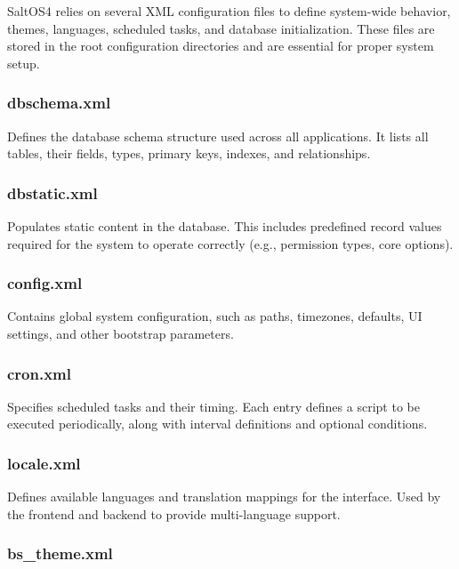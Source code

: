 \documentclass[a4paper]{article}
\begin{document}
SaltOS4 relies on several XML configuration files to define system-wide behavior, themes, languages, scheduled tasks, and database initialization. These files are stored in the root configuration directories and are essential for proper system setup.

\hypertarget{toc13}{}
\subsubsection{dbschema.xml}

Defines the database schema structure used across all applications. It lists all tables, their fields, types, primary keys, indexes, and relationships.

\hypertarget{toc14}{}
\subsubsection{dbstatic.xml}

Populates static content in the database. This includes predefined record values required for the system to operate correctly (e.g., permission types, core options).

\hypertarget{toc15}{}
\subsubsection{config.xml}

Contains global system configuration, such as paths, timezones, defaults, UI settings, and other bootstrap parameters.

\hypertarget{toc16}{}
\subsubsection{cron.xml}

Specifies scheduled tasks and their timing. Each entry defines a script to be executed periodically, along with interval definitions and optional conditions.

\hypertarget{toc17}{}
\subsubsection{locale.xml}

Defines available languages and translation mappings for the interface. Used by the frontend and backend to provide multi-language support.

\hypertarget{toc18}{}
\subsubsection{bs\_theme.xml}
\end{document}
